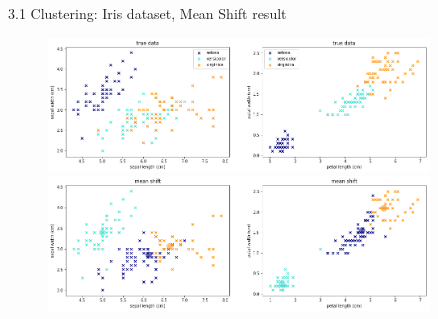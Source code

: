 \begin{frame}{3.1 Clustering: Iris dataset, Mean Shift result}
  \begin{figure}
    \includegraphics[width=0.9\textwidth]{fig/clusteringTrue.png}
    \includegraphics[width=0.9\textwidth]{fig/clusteringMeanShift.png}
  \end{figure}
\end{frame}

